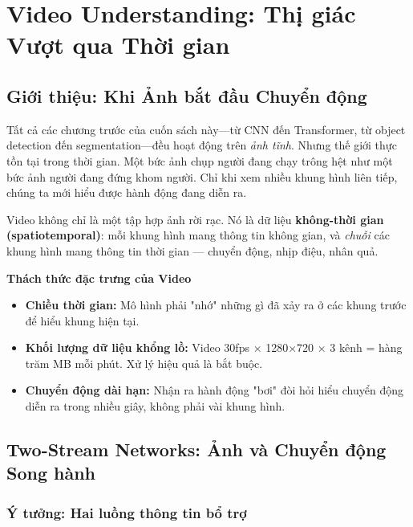 \section{Video Understanding: Thị giác Vượt qua Thời gian}
\label{sec:video_understanding}

\subsection{Giới thiệu: Khi Ảnh bắt đầu Chuyển động}
\label{subsec:video_intro}

Tất cả các chương trước của cuốn sách này—từ CNN đến Transformer, từ object detection đến segmentation—đều hoạt động trên \textit{ảnh tĩnh}. Nhưng thế giới thực tồn tại trong thời gian. Một bức ảnh chụp người đang chạy trông hệt như một bức ảnh người đang đứng khom người. Chỉ khi xem nhiều khung hình liên tiếp, chúng ta mới hiểu được hành động đang diễn ra.

Video không chỉ là một tập hợp ảnh rời rạc. Nó là dữ liệu \textbf{không-thời gian (spatiotemporal)}: mỗi khung hình mang thông tin không gian, và \textit{chuỗi} các khung hình mang thông tin thời gian — chuyển động, nhịp điệu, nhân quả.

\begin{mdframed}[style=infobox]
    \textbf{Thách thức đặc trưng của Video}
    \begin{itemize}
        \item \textbf{Chiều thời gian:} Mô hình phải "nhớ" những gì đã xảy ra ở các khung trước để hiểu khung hiện tại.
        \item \textbf{Khối lượng dữ liệu khổng lồ:} Video 30fps $\times$ 1280$\times$720 $\times$ 3 kênh = hàng trăm MB mỗi phút. Xử lý hiệu quả là bắt buộc.
        \item \textbf{Chuyển động dài hạn:} Nhận ra hành động "bơi" đòi hỏi hiểu chuyển động diễn ra trong nhiều giây, không phải vài khung hình.
    \end{itemize}
\end{mdframed}

\subsection{Two-Stream Networks: Ảnh và Chuyển động Song hành}
\label{subsec:two_stream}

\subsubsection{Ý tưởng: Hai luồng thông tin bổ trợ}
\label{subsubsec:two_stream_idea}

